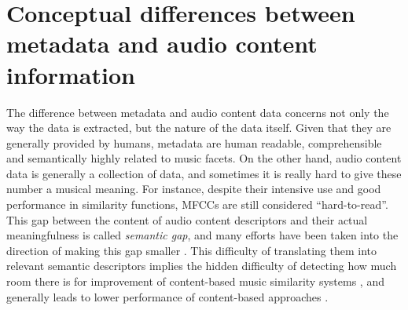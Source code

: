 \section{Conceptual differences between metadata and audio content information}
The difference between metadata and audio content data concerns not only the way the data is extracted, but the nature of the data itself. Given that they are generally provided by humans, metadata are human readable, comprehensible and semantically highly related to music facets. On the other hand, audio content data is generally a collection of data, and sometimes it is really hard to give these number a musical meaning. For instance, despite their intensive use and good performance in similarity functions, MFCCs are still considered ``hard-to-read''. This gap between the content of audio content descriptors and their actual meaningfulness is called \textit{semantic gap}, and many efforts have been taken into the direction of making this gap smaller \cite{aucou2009}. This difficulty of translating them into relevant semantic descriptors implies the hidden difficulty of detecting how much room there is for improvement of content-based music similarity systems \cite{aucou04}, and generally leads to lower performance of content-based approaches \cite{slaney2011}. \\
